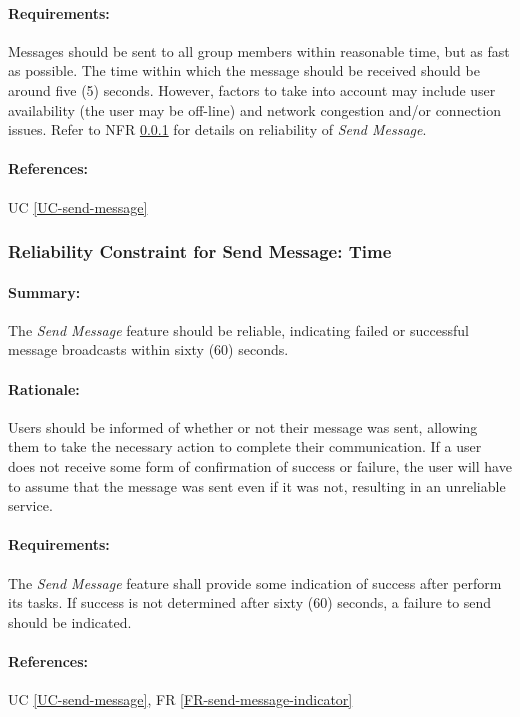\documentclass[11pt]{article}
\begin{document}
\paragraph{Requirements:} Messages should be sent to all group members within reasonable time, but as fast as possible. The time within which the message should be received should be around five (5) seconds. However, factors to take into account may include user availability (the user may be off-line) and network congestion and/or connection issues. Refer to NFR \ref{NFR-reliability-send-message-1} for details on reliability of \textit{Send Message}.
\paragraph{References:} UC \ref{UC-send-message}

\subsubsection{Reliability Constraint for Send Message: Time} \label{NFR-reliability-send-message-1}
\paragraph{Summary:} The \textit{Send Message} feature should be reliable, indicating failed or successful message broadcasts within sixty (60) seconds.
\paragraph{Rationale:} Users should be informed of whether or not their message was sent, allowing them to take the necessary action to complete their communication. If a user does not receive some form of confirmation of success or failure, the user will have to assume that the message was sent even if it was not, resulting in an unreliable service.
\paragraph{Requirements:} The \textit{Send Message} feature shall provide some indication of success after perform its tasks. If success is not determined after sixty (60) seconds, a failure to send should be indicated.
\paragraph{References:} UC \ref{UC-send-message}, FR \ref{FR-send-message-indicator}
\end{document}
